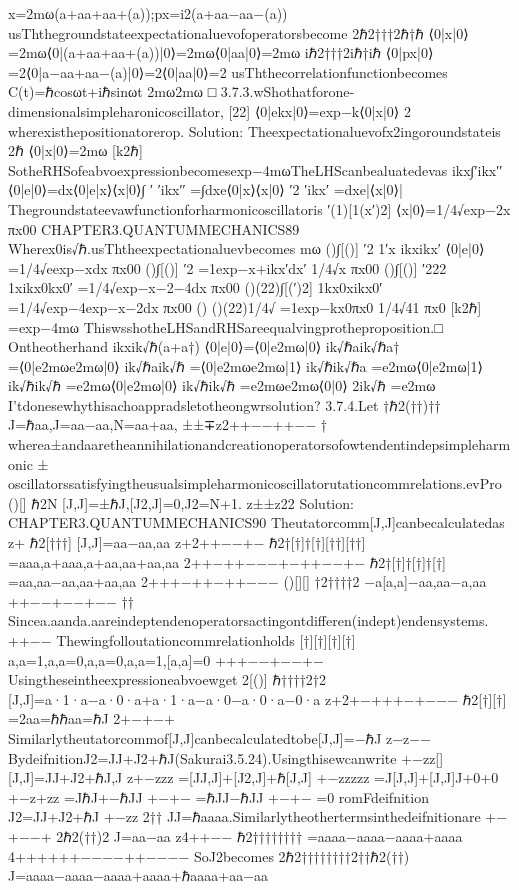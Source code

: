 {{x=2mω(a+aa+aa+(a));px=i2(a+aa−aa−(a))
usThthegroundstateexpectationaluevofoperatorsbecome
2ℏ2†††2ℏ†ℏ
⟨0|x|0⟩=2mω⟨0|(a+aa+aa+(a))|0⟩=2mω⟨0|aa|0⟩=2mω
iℏ2†††2iℏ†iℏ
⟨0|px|0⟩=2⟨0|a−aa+aa−(a)|0⟩=2⟨0|aa|0⟩=2
usThthecorrelationfunctionbecomes
C(t)=ℏcosωt+iℏsinωt
2mω2mω
□
3.7.3.wShothatforone-dimensionalsimpleharonicoscillator,
[22]
⟨0|ekx|0⟩=exp−k⟨0|x|0⟩
2
wherexisthepositionatorerop.
Solution:
Theexpectationaluevofx2ingoroundstateis
2ℏ
⟨0|x|0⟩=2mω
[k2ℏ]
SotheRHSofeabvoexpressionbecomesexp−4mωTheLHScanbealuatedevas
ikx∫′ikx′′
⟨0|e|0⟩=dx⟨0|e|x⟩⟨x|0⟩∫
′
′ikx′′
=∫dxe⟨0|x⟩⟨x|0⟩
′2
′ikx′
=dxe|⟨x|0⟩|
Thegroundstateevawfunctionforharmonicoscillatoris
′(1)[1(x′)2]
⟨x|0⟩=1/4√exp−2x
πx00
CHAPTER3.QUANTUMMECHANICS89
Wherex0is√ℏ.usThtheexpectationaluevbecomes
mω
()∫[()]
′2
1′x
ikxikx′
⟨0|e|0⟩=1/4√eexp−xdx
πx00
()∫[()]
′2
=1exp−x+ikx′dx′
1/4√x
πx00
()∫[()]
′222
1xikx0kx0′
=1/4√exp−x−2−4dx
πx00
()(22)∫[(′)2]
1kx0xikx0′
=1/4√exp−4exp−x−2dx
πx00
()
()(22)1/4√
=1exp−kx0πx0
1/4√41
πx0
[k2ℏ]
=exp−4mω
ThiswsshotheLHSandRHSareequalvingprotheproposition.□
Ontheotherhand
ikxik√ℏ(a+a†)
⟨0|e|0⟩=⟨0|e2mω|0⟩
ik√ℏaik√ℏa†
=⟨0|e2mωe2mω|0⟩
ik√ℏaik√ℏ
=⟨0|e2mωe2mω|1⟩
ik√ℏik√ℏa
=e2mω⟨0|e2mω|1⟩
ik√ℏik√ℏ
=e2mω⟨0|e2mω|0⟩
ik√ℏik√ℏ
=e2mωe2mω⟨0|0⟩
2ik√ℏ
=e2mω
I’tdonesewhythisachoappradsletotheongwrsolution?
3.7.4.Let
†ℏ2(††)††
J=ℏaa,J=aa−aa,N=aa+aa,
±±∓z2++−−++−−
†
wherea±andaaretheannihilationandcreationoperatorsofowtendentindepsimpleharmonic
±
oscillatorssatisfyingtheusualsimpleharmonicoscillatorutationcommrelations.evPro
()[]
ℏ2N
[J,J]=±ℏJ,[J2,J]=0,J2=N+1.
z±±z22
Solution:
CHAPTER3.QUANTUMMECHANICS90
Theutatorcomm[J,J]canbecalculatedas
z+
ℏ2[†††]
[J,J]=aa−aa,aa
z+2++−−+−
ℏ2†[†]†[†][††][††]
=aaa,a+aaa,a+aa,aa+aa,aa
2++−++−−−+−++−−+−
ℏ2†[†]†[†]†[†]
=aa,aa−aa,aa+aa,aa
2+++−++−++−−−
()[][]
†2††††2
−a[a,a]−aa,aa−a,aa
++−−+−−+−−
{†}{†}
Sincea.aanda.aareindeptendenoperatorsactingontdifferen(indept)endensystems.
++−−
Thewingfolloutationcommrelationholds
[†][†][†][†]
a,a=1,a,a=0,a,a=0,a,a=1,[a,a]=0
+++−−+−−+−
Usingtheseintheexpressioneabvoewget
2[()]
ℏ††††2†2
[J,J]=a·1·a−a·0·a+a·1·a−a·0−a·0·a−0·a
z+2+−+++−+−−−
ℏ2[†][†]
=2aa=ℏℏaa=ℏJ
2+−+−+
Similarlytheutatorcommof[J,J]canbecalculatedtobe[J,J]=−ℏJ
z−z−−
BydeifnitionJ2=JJ+J2+ℏJ(Sakurai3.5.24).Usingthisewcanwrite
+−zz[]
[J,J]=JJ+J2+ℏJ,J
z+−zzz
=[JJ,J]+[J2,J]+ℏ[J,J]
+−zzzzz
=J[J,J]+[J,J]J+0+0
+−z+zz
=J{ℏJ}+{−ℏJ}J
+−+−
=ℏJJ−ℏJJ
+−+−
=0
romFdeifnition
J2=JJ+J2+ℏJ
+−zz
2††
JJ=ℏaaaa.Similarlytheothertermsinthedeifnitionare
+−+−−+
2ℏ2(††)2
J=aa−aa
z4++−−
ℏ2{††††††††}
=aaaa−aaaa−aaaa+aaaa
4++++++−−−−++−−−−
SoJ2becomes
2ℏ2{††††††††}2††ℏ2(††)
J=aaaa−aaaa−aaaa+aaaa+ℏaaaa+aa−aa
}}
